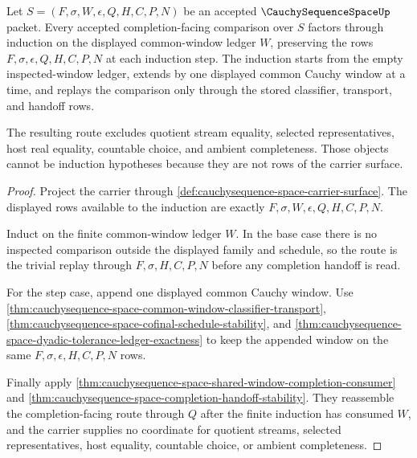 \begin{theorem}
\label{thm:cauchy-sequence-space-common-window-induction}
Let $S=(F,\sigma,W,\epsilon,Q,H,C,P,N)$ be an accepted $\CauchySequenceSpaceUp$ packet. Every accepted completion-facing comparison over $S$ factors through induction on the displayed common-window ledger $W$, preserving the rows $F,\sigma,\epsilon,Q,H,C,P,N$ at each induction step. The induction starts from the empty inspected-window ledger, extends by one displayed common Cauchy window at a time, and replays the comparison only through the stored classifier, transport, and handoff rows.

The resulting route excludes quotient stream equality, selected representatives, host real equality, countable choice, and ambient completeness. Those objects cannot be induction hypotheses because they are not rows of the carrier surface.
\end{theorem}
\begin{proof}
Project the carrier through \autoref{def:cauchysequence-space-carrier-surface}. The displayed rows available to the induction are exactly $F,\sigma,W,\epsilon,Q,H,C,P,N$.

Induct on the finite common-window ledger $W$. In the base case there is no inspected comparison outside the displayed family and schedule, so the route is the trivial replay through $F,\sigma,H,C,P,N$ before any completion handoff is read.

For the step case, append one displayed common Cauchy window. Use \autoref{thm:cauchysequence-space-common-window-classifier-transport}, \autoref{thm:cauchysequence-space-cofinal-schedule-stability}, and \autoref{thm:cauchysequence-space-dyadic-tolerance-ledger-exactness} to keep the appended window on the same $F,\sigma,\epsilon,H,C,P,N$ rows.

Finally apply \autoref{thm:cauchysequence-space-shared-window-completion-consumer} and \autoref{thm:cauchysequence-space-completion-handoff-stability}. They reassemble the completion-facing route through $Q$ after the finite induction has consumed $W$, and the carrier supplies no coordinate for quotient streams, selected representatives, host equality, countable choice, or ambient completeness.
\end{proof}

